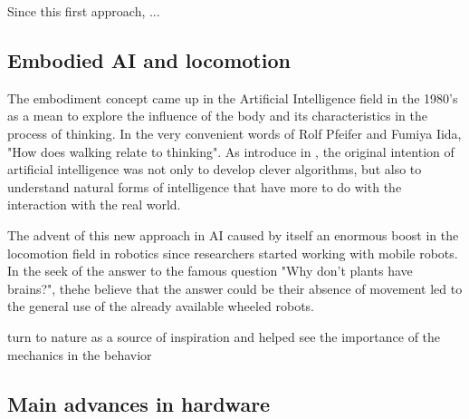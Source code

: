 Since this first approach, ...


\subsection{Embodied AI and locomotion} %
\label{sub:the_embodiment_}
The embodiment concept came up in the Artificial Intelligence field in the 1980's as a mean to explore the influence of the body and its characteristics in the process of thinking. 
In the very convenient words of Rolf Pfeifer and Fumiya Iida, "How does walking relate to thinking".
As introduce in \cite{pfeifer}, the original intention of artificial intelligence was not only to develop clever algorithms, but also to understand natural forms of intelligence that have more to do with the interaction with the real world.

The advent of this new approach in AI caused by itself an enormous boost in the locomotion field in robotics since researchers started working with mobile robots.
In the seek of the answer to the famous question "Why don’t plants have brains?", thehe believe that the answer could be their absence of movement led to the general use of the already available wheeled robots.



turn to nature as a source of inspiration and helped see the importance of the mechanics in the behavior



\subsection{Main advances in hardware} %
\label{sub:the_advances_in_hardware}



